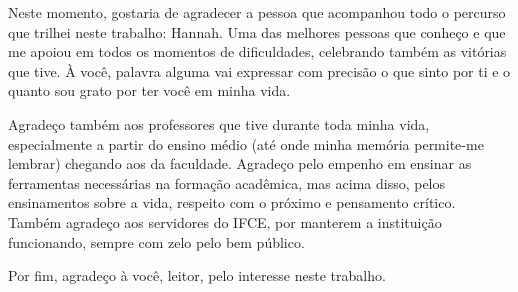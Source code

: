 \begin{agradecimentos}
Neste momento, gostaria de agradecer a pessoa que acompanhou todo o percurso que trilhei neste trabalho: Hannah. Uma das melhores pessoas que conheço e que me apoiou em todos os momentos de dificuldades, celebrando também as vitórias que tive. À você, palavra alguma vai expressar com precisão o que sinto por ti e o quanto sou grato por ter você em minha vida.

Agradeço também aos professores que tive durante toda minha vida, especialmente a partir do ensino médio (até onde minha memória permite-me lembrar) chegando aos da faculdade. Agradeço pelo empenho em ensinar as ferramentas necessárias na formação acadêmica, mas acima disso, pelos ensinamentos sobre a vida, respeito com o próximo e pensamento crítico. Também agradeço aos servidores do IFCE, por manterem a instituição funcionando, sempre com zelo pelo bem público.

Por fim, agradeço à você, leitor, pelo interesse neste trabalho.
\end{agradecimentos}
